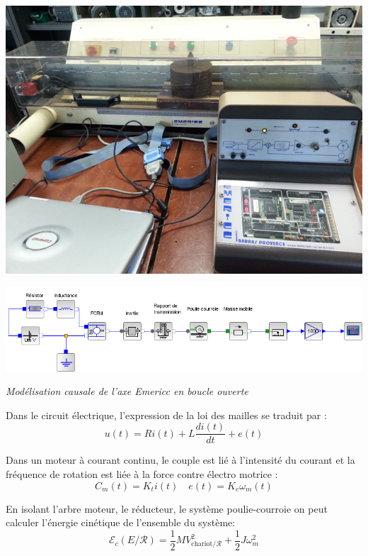 \documentclass[10pt]{article}
\begin{document}
\begin{minipage}[c]{.4\linewidth}
\begin{center}
\includegraphics[width=.95\textwidth]{images/emericc}
\end{center}

\end{minipage} \hfill
\begin{minipage}[c]{.55\linewidth}
\begin{center}
\includegraphics[width=\textwidth]{images/emericc_acausal}

\textit{Modélisation causale de l'axe Emericc en boucle ouverte}
\end{center}
\end{minipage}


\vspace{.25cm}

Dans le circuit électrique, l'expression de la loi des mailles se traduit par :
$$
u(t)= Ri(t)+L\dfrac{di(t)}{dt}+ e(t)
$$

Dans un moteur à courant continu, le couple est lié à l'intensité du courant et la fréquence de rotation est liée à la force contre électro motrice :
$$
C_m(t)=K_t i(t) \quad e(t)=K_e \omega_m(t)
$$

En isolant l'arbre moteur, le réducteur, le système poulie-courroie on peut calculer l'énergie cinétique de l'ensemble du système: 
$$
\mathcal{E}_c\left(E/\mathcal{R}\right)=\dfrac{1}{2}MV_{\text{chariot}/\mathcal{R}} ^2 + \dfrac{1}{2}J\omega_m^2
$$
\end{document}
